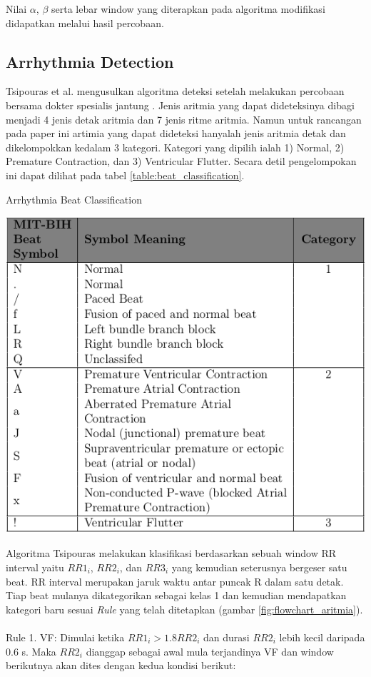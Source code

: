 \documentclass[]{indojc}
\begin{document}
Nilai $\alpha$, $\beta$ serta lebar window yang diterapkan pada algoritma modifikasi didapatkan melalui hasil percobaan.

\subsection{Arrhythmia Detection}
Tsipouras et al. mengusulkan algoritma deteksi setelah melakukan percobaan bersama dokter spesialis jantung \cite{tsipouras}. Jenis aritmia yang dapat dideteksinya dibagi menjadi 4 jenis detak aritmia dan 7 jenis ritme aritmia. Namun untuk rancangan pada paper ini artimia yang dapat dideteksi hanyalah jenis aritmia detak dan dikelompokkan kedalam 3 kategori. Kategori yang dipilih ialah 1) Normal, 2) Premature Contraction, dan 3) Ventricular Flutter. Secara detil pengelompokan ini dapat dilihat pada tabel \ref{table:beat_classification}.

\begin{table}[htbp]
	\begin{center}
	\caption{Arrhythmia Beat Classification}
	\includegraphics[scale=0.35]{images/class.png}	
	\label{table:beat_classification}
	\end{center}
\end{table}

Algoritma Tsipouras melakukan klasifikasi berdasarkan sebuah window RR interval yaitu $RR1_i$, $RR2_i$, dan $RR3_i$ yang kemudian seterusnya bergeser satu beat. RR interval merupakan jaruk waktu antar puncak R dalam satu detak. Tiap beat mulanya dikategorikan sebagai kelas 1 dan kemudian mendapatkan kategori baru sesuai \textit{Rule} yang telah ditetapkan (gambar \ref{fig:flowchart_aritmia}).
\\
\\
Rule 1. VF: Dimulai ketika $RR1_i > 1.8RR2_i$ dan durasi $RR2_i$ lebih kecil daripada 0.6 s. Maka $RR2_i$ dianggap sebagai awal mula terjandinya VF dan window berikutnya akan dites dengan kedua kondisi berikut:
\end{document}
